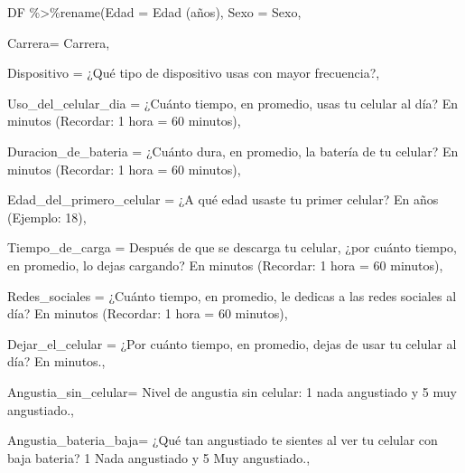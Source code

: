 \documentclass[
]{article}
\newenvironment{Shaded}{\begin{snugshade}}{\end{snugshade}}
\newcommand{\AttributeTok}[1]{\textcolor[rgb]{0.77,0.63,0.00}{#1}}
\newcommand{\FunctionTok}[1]{\textcolor[rgb]{0.00,0.00,0.00}{#1}}
\newcommand{\NormalTok}[1]{#1}
\newcommand{\SpecialCharTok}[1]{\textcolor[rgb]{0.00,0.00,0.00}{#1}}
\newcommand{\StringTok}[1]{\textcolor[rgb]{0.31,0.60,0.02}{#1}}
\begin{document}
\begin{Shaded}
\begin{Highlighting}[]
\NormalTok{DF }\SpecialCharTok{\%\textgreater{}\%}\FunctionTok{rename}\NormalTok{(}\AttributeTok{Edad =} \StringTok{\textasciigrave{}}\AttributeTok{Edad (años)}\StringTok{\textasciigrave{}}\NormalTok{,}
\AttributeTok{Sexo =}\NormalTok{ Sexo, }

\AttributeTok{Carrera=}\NormalTok{ Carrera,}
             
\AttributeTok{Dispositivo =} \StringTok{\textasciigrave{}}\AttributeTok{¿Qué tipo de dispositivo usas con mayor  frecuencia?}\StringTok{\textasciigrave{}}\NormalTok{,}

\AttributeTok{Uso\_del\_celular\_dia =} \StringTok{\textasciigrave{}}\AttributeTok{¿Cuánto tiempo, en promedio, usas tu celular al día? En minutos (Recordar: 1 hora = 60 minutos)}\StringTok{\textasciigrave{}}\NormalTok{,}

\AttributeTok{Duracion\_de\_bateria =} \StringTok{\textasciigrave{}}\AttributeTok{¿Cuánto dura, en promedio, la batería de tu celular?  En minutos (Recordar: 1 hora = 60 minutos)}\StringTok{\textasciigrave{}}\NormalTok{,}
             
\AttributeTok{Edad\_del\_primero\_celular =} \StringTok{\textasciigrave{}}\AttributeTok{¿A qué edad usaste tu primer celular? En años (Ejemplo: 18)}\StringTok{\textasciigrave{}}\NormalTok{, }

\AttributeTok{Tiempo\_de\_carga =} \StringTok{\textasciigrave{}}\AttributeTok{Después de que se descarga tu celular, ¿por cuánto tiempo, en promedio, lo dejas cargando? En minutos (Recordar: 1 hora = 60 minutos)}\StringTok{\textasciigrave{}}\NormalTok{,}

\AttributeTok{Redes\_sociales =} \StringTok{\textasciigrave{}}\AttributeTok{¿Cuánto tiempo, en promedio, le dedicas a las redes sociales al día? En minutos  (Recordar: 1 hora = 60 minutos)}\StringTok{\textasciigrave{}}\NormalTok{,}

\AttributeTok{Dejar\_el\_celular =} \StringTok{\textasciigrave{}}\AttributeTok{¿Por cuánto tiempo, en promedio, dejas de usar tu celular al día? En minutos.}\StringTok{\textasciigrave{}}\NormalTok{,}

\AttributeTok{Angustia\_sin\_celular=} \StringTok{\textasciigrave{}}\AttributeTok{Nivel de angustia sin celular: 1 nada angustiado y 5 muy angustiado.}\StringTok{\textasciigrave{}}\NormalTok{, }

\AttributeTok{Angustia\_bateria\_baja=} \StringTok{\textasciigrave{}}\AttributeTok{¿Qué tan angustiado te sientes al ver tu celular con baja bateria?  1 Nada angustiado y 5 Muy angustiado.}\StringTok{\textasciigrave{}}\NormalTok{, }


\end{Highlighting}
\end{Shaded}
\end{document}
